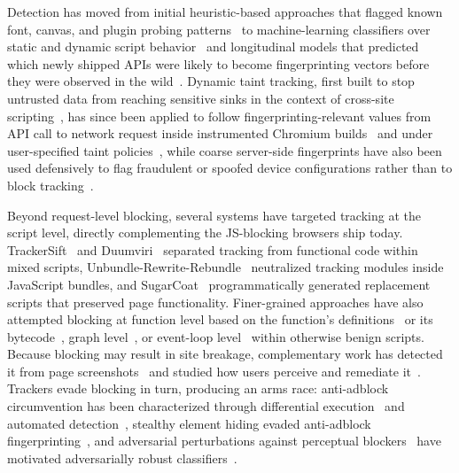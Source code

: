 %
Detection has moved from initial heuristic-based approaches that flagged known font, canvas, and plugin probing patterns~\cite{acarFPDetectiveDustingWeb2013} to machine-learning classifiers over static and dynamic script behavior~\cite{iqbalFingerprintingFingerprintersLearning2021} and longitudinal models that predicted which newly shipped APIs were likely to become fingerprinting vectors before they were observed in the wild~\cite{bahramiFPRadarLongitudinalMeasurement2022}.
%
Dynamic taint tracking, first built to stop untrusted data from reaching sensitive sinks in the context of cross-site scripting~\cite{vogtCrossSiteScripting2007}, has since been applied to follow fingerprinting-relevant values from API call to network request inside instrumented Chromium builds~\cite{boussahaFPtracerFinegrainedBrowser2024,kanyalPanoptiChromeModernInbrowser2024} and under user-specified taint policies~\cite{hubletUserControlledPrivacyTaint2024}, while coarse server-side fingerprints have also been used defensively to flag fraudulent or spoofed device configurations rather than to block tracking~\cite{kalantariBrowserPolygraphEfficient2024}.


Beyond request-level blocking, several systems have targeted tracking at the script level, directly complementing the JS-blocking browsers ship today.
%
TrackerSift~\cite{amjadTrackerSiftUntanglingMixed2021} and Duumviri~\cite{shuangDuumviriDetectingTrackers2025} separated tracking from functional code within mixed scripts, Unbundle-Rewrite-Rebundle~\cite{aliUnbundleRewriteRebundleRuntimeDetection2024} neutralized tracking modules inside JavaScript bundles, and SugarCoat~\cite{smithSugarCoatProgrammaticallyGenerating2021} programmatically generated replacement scripts that preserved page functionality.
%
Finer-grained approaches have also attempted blocking at function level based on the function's definitions~\cite{amjadBlockingJavaScriptBreaking2023,amjadBlockingTrackingJavaScript2024} or its bytecode~\cite{ghasemisharifReadLinesDetecting2023,bahramiByteByteUnmasking2025}, graph level~\cite{parkCGCContrastiveGraph2022}, or event-loop level~\cite{chenDetectingFilterList2021} within otherwise benign scripts. 
%
Because blocking may result in site breakage, complementary work has detected it from page screenshots~\cite{hajjchehadeSINBADSaliencyinformedDetection2024} and studied how users perceive and remediate it~\cite{nisenoffDefiningBrokenUser2023}.
%
Trackers evade blocking in turn, producing an arms race: anti-adblock circumvention has been characterized through differential execution~\cite{zhuMeasuringDisruptingAntiAdblockers2018} and automated detection~\cite{leCVInspectorAutomatingDetection2021}, stealthy element hiding evaded anti-adblock fingerprinting~\cite{zhuShadowBlockLightweightStealthy2019}, and adversarial perturbations against perceptual blockers~\cite{tramerAdVersarialPerceptualAd2019} have motivated adversarially robust classifiers~\cite{limAdVersaAdversariallyRobustPractical2026}.


